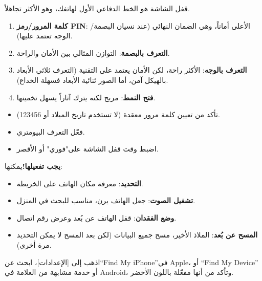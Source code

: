 


قفل الشاشة هو الخط الدفاعي الأول لهاتفك، وهو الأكثر تجاهلاً.


\begin{enumerate}
  \item \textbf{كلمة المرور/رمز PIN}: الأعلى أماناً، وهي الضمان النهائي (عند نسيان البصمة/الوجه تعتمد عليها).
  \item \textbf{التعرف بالبصمة}: التوازن المثالي بين الأمان والراحة.
  \item \textbf{التعرف بالوجه}: الأكثر راحة، لكن الأمان يعتمد على التقنية (التعرف ثلاثي الأبعاد بالهيكل آمن، أما الصور ثنائية الأبعاد فسهلة الخداع).
  \item \textbf{فتح النمط}: مريح لكنه يترك آثاراً يسهل تخمينها.
\end{enumerate}


\begin{itemize}
  \item تأكد من تعيين كلمة مرور معقدة (لا تستخدم تاريخ الميلاد أو 123456).
  \item فعّل التعرف البيومتري.
  \item اضبط وقت قفل الشاشة على"فوري" أو الأقصر.
\end{itemize}


\textbf{يجب تفعيلها!}يمكنها:

\begin{itemize}
  \item \textbf{التحديد}: معرفة مكان الهاتف على الخريطة.
  \item \textbf{تشغيل الصوت}: جعل الهاتف يرن، مناسب للبحث في المنزل.
  \item \textbf{وضع الفقدان}: قفل الهاتف عن بُعد وعرض رقم اتصال.
  \item \textbf{المسح عن بُعد}: الملاذ الأخير، مسح جميع البيانات (لكن بعد المسح لا يمكن التحديد مرة أخرى).
\end{itemize}

اذهب إلى [الإعدادات]، ابحث عن“Find My iPhone”في Apple، أو “Find My Device” أو خدمة مشابهة من العلامة في Android، وتأكد من أنها مفعّلة باللون الأخضر.

